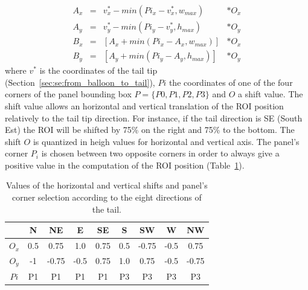 \begin{equation}
  \label{eq:se:roi_position_around_balloon}
  \begin{array}{rccl} 
	  A_x & = & v^*_x - min(Pi_x - v^*_x, w_{max}) & * O_x \\ 
	  A_y & = & v^*_y - min(Pi_y - v^*_y, h_{max}) & * O_y \\ 
	  B_x & = & \left[ A_x + min(Pi_x - A_x, w_{max}) \right] & * O_x \\ 
	  B_y & = & \left[ A_y + min(Pi_y - A_y, h_{max}) \right] & * O_y
  \end{array} 
\end{equation}
where $v^*$ is the coordinates of the tail tip (Section~\ref{sec:se:from_balloon_to_tail}), $Pi$ the coordinates of one of the four corners of the panel bounding box $P=\{P0, P1, P2, P3\}$ and $O$ a shift value.
The shift value allows an horizontal and vertical translation of the ROI position relatively to the tail tip direction.
For instance, if the tail direction is SE (South Est) the ROI will be shifted by 75\% on the right and 75\% to the bottom.
The shift $O$ is quantized in heigh values for horizontal and vertical axis.
The panel's corner $P_i$ is chosen between two opposite corners in order to always give a positive value in the computation of the ROI position (Table~\ref{tab:se:offset_panel_corner}).

  \begin{table}[ht]
    \normalsize

    \centering
    \caption{Values of the horizontal and vertical shifts and panel's corner selection according to the eight directions of the tail.}
    \setlength{\tabcolsep}{.45em}
    \begin{tabular}{|c|c|c|c|c|c|c|c|c|}

          \hline
	      &  N  & NE  & E  & SE & S & SW & W & NW   \\
	      \hline
	      $O_x$   & 0.5  & 0.75 & 1.0  & 0.75 & 0.5 & -0.75& -0.5 & 0.75  \\
	      \hline
	      $O_y$   & -1   & -0.75& -0.5 & 0.75 & 1.0 & 0.75 & -0.5 & -0.75  \\
	      \hline
	      $Pi$    & P1   & P1   & P1   & P1   & P3  & P3   & P3   & P3   \\
          \hline
        \end{tabular}
    \label{tab:se:offset_panel_corner}
  \end{table}%


